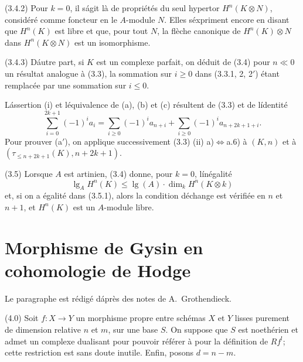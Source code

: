 \documentclass[12pt]{amsart}
\theoremstyle{plain}
\theoremstyle{remark}
\DeclareMathOperator{\lgB}{lg}
\begin{document}
(3.4.2) Pour $k = 0$, il s\'agit l\`a de propri\'et\'es du seul hypertor $H^n(K \otimes N)$, consid\'er\'e comme foncteur en le $A$-module $N$. Elles s\'expriment encore en disant que $H^n(K)$ est libre et que, pour tout $N$, la fl\`eche canonique de $H^n(K) \otimes N$ dans $H^n(K \otimes N)$ est un isomorphisme.

(3.4.3) D\'autre part, si $K$ est un complexe parfait, on d\'eduit de (3.4) pour $n \ll 0$ un r\'esultat analogue \`a (3.3), la sommation sur $i \geq 0$ dans (3.3.1, 2, 2$'$) \'etant remplac\'ee par une sommation sur $i \leq 0$.

L\'assertion (i) et l\'equivalence de (a), (b) et (c) r\'esultent de (3.3) et de l\'identit\'e
\[
\sum_{i=0}^{2k+1} (-1)^i a_i = \sum_{i \geq 0} (-1)^i a_{n+i} + \sum_{i \geq 0} (-1)^i a_{n+2k+1+i}.
\]
Pour prouver (a$'$), on applique successivement (3.3) (ii) a)$\Leftrightarrow$a.6) \`a $(K, n)$ et \`a $(\tau_{\leq n+2k+1}(K), n+2k+1)$.

(3.5) Lorsque $A$ est artinien, (3.4) donne, pour $k = 0$, l\'in\'egalit\'e
\begin{equation}\label{eq:3.5.1}
\lgB_A H^n(K) \leq \lgB(A) \cdot \dim_k H^n(K \otimes k)
\end{equation}
et, si on a \'egalit\'e dans (3.5.1), alors la condition d\'echange est v\'erifi\'ee en $n$ et $n+1$, et $H^n(K)$ est un $A$-module libre.


\section{Morphisme de Gysin en cohomologie de Hodge}

Le paragraphe est r\'edig\'e d\'apr\`es des notes de A.~Grothendieck.

(4.0) Soit $f : X \to Y$ un morphisme propre entre sch\'emas $X$ et $Y$ lisses purement de dimension relative $n$ et $m$, sur une base $S$. On suppose que $S$ est noeth\'erien et admet un complexe dualisant pour pouvoir r\'ef\'erer \`a \cite{Hartshorne} pour la d\'efinition de $R f^!$; cette restriction est sans doute inutile. Enfin, posons $d = n - m$.
\end{document}
